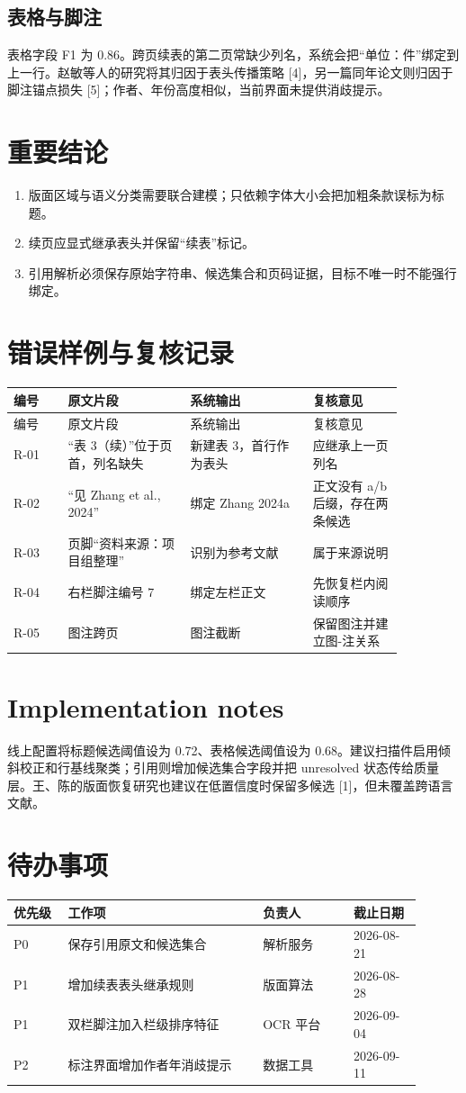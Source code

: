 \documentclass[11pt]{article}
\begin{document}
\subsection*{表格与脚注}
表格字段 F1 为 0.86。跨页续表的第二页常缺少列名，系统会把“单位：件”绑定到上一行。赵敏等人的研究将其归因于表头传播策略 [4]，另一篇同年论文则归因于脚注锚点损失 [5]；作者、年份高度相似，当前界面未提供消歧提示。
\section*{重要结论}
\begin{enumerate}\item 版面区域与语义分类需要联合建模；只依赖字体大小会把加粗条款误标为标题。\item 续页应显式继承表头并保留“续表”标记。\item 引用解析必须保存原始字符串、候选集合和页码证据，目标不唯一时不能强行绑定。\end{enumerate}
\newpage
\section*{错误样例与复核记录}
\begin{longtable}{p{0.12\linewidth}p{0.27\linewidth}p{0.27\linewidth}p{0.20\linewidth}}\toprule 编号&原文片段&系统输出&复核意见\\\midrule\endfirsthead\toprule 编号&原文片段&系统输出&复核意见\\\midrule\endhead R-01&“表 3（续）”位于页首，列名缺失&新建表 3，首行作为表头&应继承上一页列名\\ R-02&“见 Zhang et al., 2024”&绑定 Zhang 2024a&正文没有 a/b 后缀，存在两条候选\\ R-03&页脚“资料来源：项目组整理”&识别为参考文献&属于来源说明\\ R-04&右栏脚注编号 7&绑定左栏正文&先恢复栏内阅读顺序\\ R-05&图注跨页&图注截断&保留图注并建立图-注关系\\\bottomrule\end{longtable}
\section*{Implementation notes}
线上配置将标题候选阈值设为 0.72、表格候选阈值设为 0.68。建议扫描件启用倾斜校正和行基线聚类；引用则增加候选集合字段并把 unresolved 状态传给质量层。王、陈的版面恢复研究也建议在低置信度时保留多候选 [1]，但未覆盖跨语言文献。
\section*{待办事项}
\begin{tabular}{p{0.12\linewidth}p{0.43\linewidth}p{0.20\linewidth}p{0.15\linewidth}}\toprule 优先级&工作项&负责人&截止日期\\\midrule P0&保存引用原文和候选集合&解析服务&2026-08-21\\P1&增加续表表头继承规则&版面算法&2026-08-28\\P1&双栏脚注加入栏级排序特征&OCR 平台&2026-09-04\\P2&标注界面增加作者年消歧提示&数据工具&2026-09-11\\\bottomrule\end{tabular}
\newpage
\end{document}
